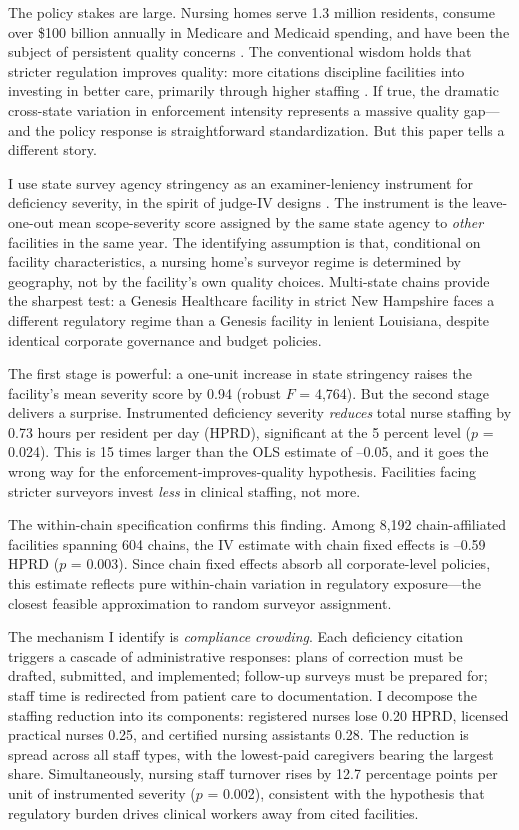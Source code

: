 \documentclass[12pt]{article}
\begin{document}
The policy stakes are large. Nursing homes serve 1.3 million residents, consume over \$100 billion annually in Medicare and Medicaid spending, and have been the subject of persistent quality concerns \citep{Bowblis2011, Harrington2012}. The conventional wisdom holds that stricter regulation improves quality: more citations discipline facilities into investing in better care, primarily through higher staffing \citep{Mukamel2012, Castle2011}. If true, the dramatic cross-state variation in enforcement intensity represents a massive quality gap---and the policy response is straightforward standardization. But this paper tells a different story.

I use state survey agency stringency as an examiner-leniency instrument for deficiency severity, in the spirit of judge-IV designs \citep{Kling2006, Doyle2007}. The instrument is the leave-one-out mean scope-severity score assigned by the same state agency to \textit{other} facilities in the same year. The identifying assumption is that, conditional on facility characteristics, a nursing home's surveyor regime is determined by geography, not by the facility's own quality choices. Multi-state chains provide the sharpest test: a Genesis Healthcare facility in strict New Hampshire faces a different regulatory regime than a Genesis facility in lenient Louisiana, despite identical corporate governance and budget policies.

The first stage is powerful: a one-unit increase in state stringency raises the facility's mean severity score by 0.94 (robust $F$ = 4,764). But the second stage delivers a surprise. Instrumented deficiency severity \textit{reduces} total nurse staffing by 0.73 hours per resident per day (HPRD), significant at the 5 percent level ($p$ = 0.024). This is 15 times larger than the OLS estimate of --0.05, and it goes the wrong way for the enforcement-improves-quality hypothesis. Facilities facing stricter surveyors invest \textit{less} in clinical staffing, not more.

The within-chain specification confirms this finding. Among 8,192 chain-affiliated facilities spanning 604 chains, the IV estimate with chain fixed effects is --0.59 HPRD ($p$ = 0.003). Since chain fixed effects absorb all corporate-level policies, this estimate reflects pure within-chain variation in regulatory exposure---the closest feasible approximation to random surveyor assignment.

The mechanism I identify is \textit{compliance crowding}. Each deficiency citation triggers a cascade of administrative responses: plans of correction must be drafted, submitted, and implemented; follow-up surveys must be prepared for; staff time is redirected from patient care to documentation. I decompose the staffing reduction into its components: registered nurses lose 0.20 HPRD, licensed practical nurses 0.25, and certified nursing assistants 0.28. The reduction is spread across all staff types, with the lowest-paid caregivers bearing the largest share. Simultaneously, nursing staff turnover rises by 12.7 percentage points per unit of instrumented severity ($p$ = 0.002), consistent with the hypothesis that regulatory burden drives clinical workers away from cited facilities.
\end{document}
